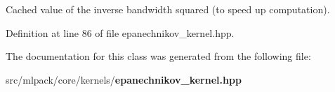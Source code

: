 Cached value of the inverse bandwidth squared (to speed up computation). 



Definition at line 86 of file epanechnikov\-\_\-kernel.\-hpp.



The documentation for this class was generated from the following file\-:\begin{DoxyCompactItemize}
\item 
src/mlpack/core/kernels/{\bf epanechnikov\-\_\-kernel.\-hpp}\end{DoxyCompactItemize}

